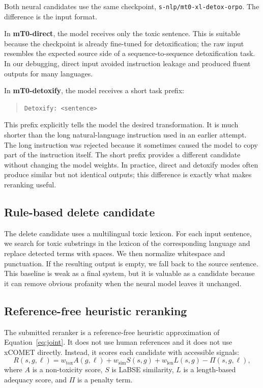\documentclass{article}
\begin{document}
Both neural candidates use the same checkpoint, \texttt{s-nlp/mt0-xl-detox-orpo}. The difference is the input format.

In \textbf{mT0-direct}, the model receives only the toxic sentence. This is suitable because the checkpoint is already fine-tuned for detoxification; the raw input resembles the expected source side of a sequence-to-sequence detoxification task. In our debugging, direct input avoided instruction leakage and produced fluent outputs for many languages.

In \textbf{mT0-detoxify}, the model receives a short task prefix:
\begin{quote}
\texttt{Detoxify: <sentence>}
\end{quote}
This prefix explicitly tells the model the desired transformation. It is much shorter than the long natural-language instruction used in an earlier attempt. The long instruction was rejected because it sometimes caused the model to copy part of the instruction itself. The short prefix provides a different candidate without changing the model weights. In practice, direct and detoxify modes often produce similar but not identical outputs; this difference is exactly what makes reranking useful.

\subsection{Rule-based delete candidate}

The delete candidate uses a multilingual toxic lexicon. For each input sentence, we search for toxic substrings in the lexicon of the corresponding language and replace detected terms with spaces. We then normalize whitespace and punctuation. If the resulting output is empty, we fall back to the source sentence. This baseline is weak as a final system, but it is valuable as a candidate because it can remove obvious profanity when the neural model leaves it unchanged.

\subsection{Reference-free heuristic reranking}

The submitted reranker is a reference-free heuristic approximation of Equation~\ref{eq:joint}. It does not use human references and it does not use xCOMET directly. Instead, it scores each candidate with accessible signals:
\begin{equation}
R(s,g,\ell) = w_{\mathrm{tox}} A(g,\ell) + w_{\mathrm{sim}} S(s,g) + w_{\mathrm{len}} L(s,g) - \Pi(s,g,\ell),
\label{eq:heuristic}
\end{equation}
where $A$ is a non-toxicity score, $S$ is LaBSE similarity, $L$ is a length-based adequacy score, and $\Pi$ is a penalty term.
\end{document}

